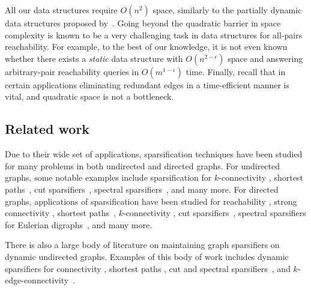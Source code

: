 \documentclass[11pt]{article}
\begin{document}
All our data structures require $O(n^2)$ space, similarly to the partially dynamic data structures proposed by~\cite{lapoutre1988}. Going beyond the quadratic barrier in space complexity is known to be a very challenging task in data structures for all-pairs reachability. For example, to the best of our knowledge, it is not even known whether there exists a \emph{static} data structure with $O(n^{2-\epsilon})$ space and answering arbitrary-pair reachability queries in $O(m^{1-\epsilon})$ time.
Finally, recall that in certain applications eliminating redundant edges in a time-efficient manner is vital, and quadratic space is not a bottleneck. 


























\subsection{Related work}

Due to their wide set of applications, sparsification techniques have been studied for many problems in both undirected and directed graphs.
For undirected graphs, some notable examples include sparsification for $k$-connectivity \cite{han1995computing, nagamochi1992linear}, shortest paths~\cite{althofer1993sparse, peleg1989graph,baswana2007simple}, cut sparsifiers~\cite{benczur1996approximating, benczur2015randomized, fung2011general}, spectral sparsifiers~\cite{spielman2008graph, spielman2011spectral}, and many more.
For directed graphs, applications of sparsification have been studied for reachability \cite{Aho:1972aa}, strong connectivity \cite{han1995computing, vetta2001approximating}, shortest paths~\cite{King:1999aa,roditty2008roundtrip}, $k$-connectivity \cite{georgiadis2016sparse, laekhanukit2012rounding, cheriyan2000approximating}, cut sparsifiers~\cite{cen2020sparsification}, spectral sparsifiers for Eulerian digraphs~\cite{cohen2016faster, sachdeva2023better}, and many more.

There is also a large body of literature on maintaining graph sparsifiers on dynamic undirected graphs. Examples of this body of work includes dynamic sparsifiers for connectivity \cite{holm2001polylogarithmic}, shortest paths \cite{baswana2012fully, forster2019dynamic, bernstein2021adeamortization}, cut and spectral sparsifiers~\cite{ittai2016onfully, bernstein2022fully}, and $k$-edge-connectivity~\cite{aamand2023optimal}. 
\end{document}
